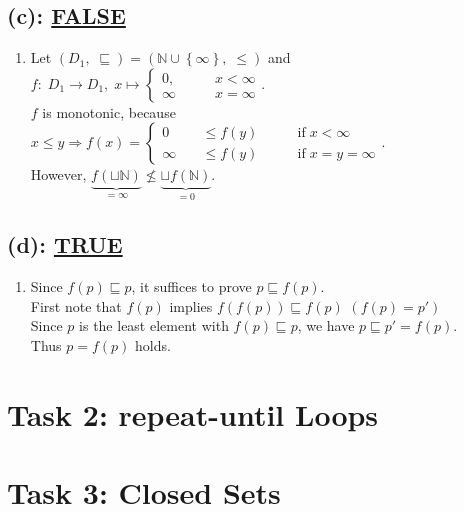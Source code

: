 \documentclass[12pt]{scrartcl}
\begin{document}
		\subsection*{(c): \underline{FALSE}}
		\begin{enumerate}
			\item[] Let $\left(D_{1},\; \sqsubseteq\right)=\left(\mathbb{N}\cup\left\{\infty\right\},\;\leq\right)$ and\\
			$f:\;D_{1}\rightarrow D_{1},\; x\mapsto\left\{
			\begin{aligned}
				0, &\qquad x<\infty\\
				\infty &\qquad x=\infty			
			\end{aligned}\right.$.\\
			$f$ is monotonic, because $x\leq y\Rightarrow f\left(x\right)=\left\{\begin{aligned}
			0 &\quad \leq f\left(y\right) &\qquad \text{if}\; x<\infty\\
			\infty &\quad \leq f\left(y\right) &\qquad \text{if}\; x=y=\infty
			\end{aligned}\right.$.\\
			However, $\underbrace{f\left(\sqcup\mathbb{N}\right)}_{=\infty}\nleq\underbrace{\sqcup f\left(\mathbb{N}\right)}_{=0}$.
		\end{enumerate}
		
		\subsection*{(d): \underline{TRUE}}
		\begin{enumerate}
			\item[] Since $f\left(p\right)\sqsubseteq p$, it suffices to prove $p\sqsubseteq f\left(p\right)$.\\
			First note that $f\left(p\right)$ implies $f\left(f\left(p\right)\right)\sqsubseteq f\left(p\right)$ \null\hfill {\color{red}$\left(f\left(p\right)=p'\right)$}\\
			Since $p$ is the least element with $f\left(p\right)\sqsubseteq p$, we have $p\sqsubseteq p'=f\left(p\right)$.\\
			Thus $p=f\left(p\right)$ holds.
		\end{enumerate}		
	\section*{Task 2: repeat-until Loops}
	
	\section*{Task 3: Closed Sets}
	
	
\end{document}

